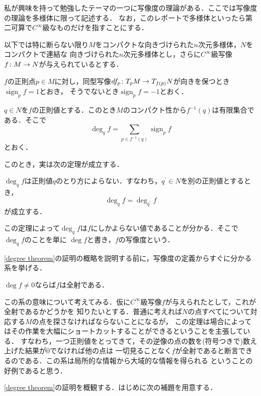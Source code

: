\documentclass[dvipdfmx,uplatex]{jsarticle}
\DeclareMathOperator{\sign}{sign}
\begin{document}
私が興味を持って勉強したテーマの一つに写像度の理論がある．ここでは写像度の理論を多様体に限って記述する．
なお，このレポートで多様体といったら第二可算で$C^\infty$級なものだけを指すことにする．

以下では特に断らない限り$M$をコンパクトな向きづけられた$n$次元多様体，$N$をコンパクトで連結な
向きづけられた$n$次元多様体とし，さらに$C^\infty$級写像$f\colon M\to N$が与えられているとする．

\begin{definition}
\begin{enumarabicp}
\item $f$の正則点$p\in M$に対し，同型写像$df_p\colon T_pM\to T_{f(p)}N$が向きを保つとき$\sign _p f=1$とおき， 
そうでないとき$\sign _pf=-1$とおく．
\item $q\in N$を$f$の正則値とする．このとき$M$のコンパクト性から$f^{-1}(q)$は有限集合である．そこで
\[ \deg_qf=\sum_{p\in f^{-1}(q)} \sign_p f \]
とおく．
\end{enumarabicp}
\end{definition}

このとき，実は次の定理が成立する．

\begin{theorem}\label{degree theorem}
$\deg_q f$は正則値$q$のとり方によらない．すなわち，$q^\prime\in N$を別の正則値とするとき，
\[ \deg_q f = \deg_{q^\prime} f \]
が成立する．
\end{theorem}

この定理によって$\deg_q f$は$f$にしかよらない値であることが分かる．そこで$\deg_q f$のことを単に
$\deg f$と書き，$f$の写像度という．

\cref{degree theorem}の証明の概略を説明する前に，写像度の定義からすぐに分かる系を挙げる．
\begin{corollary}
$\deg f \neq 0$ならば$f$は全射である．
\end{corollary}

この系の意味について考えてみる．仮に$C^\infty$級写像$f$が与えられたとして，これが全射であるかどうかを
知りたいとする．普通に考えれば$N$の点すべてについて対応する$M$の点を探さなければならないことになるが，
この定理は場合によってはその作業を大幅にショートカットすることができるということを主張している．
すなわち，一つ正則値をとってきて，その逆像の点の数を(符号つきで)数え上げた結果が0でなければ他の点は
一切見ることなく$f$が全射であると断言できるのである．この系は局所的な情報から大域的な情報を得られる
ということの好例であると思う．

\vspace{\baselineskip}
\cref{degree theorem}の証明を概観する．はじめに次の補題を用意する．
\end{document}
